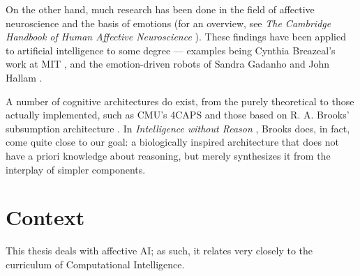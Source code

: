 \documentclass[bibliography=totoc ]{scrartcl}
\begin{document}
On the other hand, much research has been done in the field of affective neuroscience and the basis of emotions (for an overview, see {\em The Cambridge Handbook of Human Affective Neuroscience} \cite{cambridgeAff}). These findings have been applied to artificial intelligence to some degree --- examples being Cynthia Breazeal's work at MIT \cite{kismet, breazeal2003}, and the emotion-driven robots of Sandra Gadanho and John Hallam \cite{DBLP:journals/adb/GadanhoH01}.

A number of cognitive architectures do exist, from the purely theoretical \cite{emotionMachine} to those actually implemented, such as CMU's 4CAPS \cite{4caps} and those based on R. A. Brooks' subsumption architecture \cite{brooksSubsumption}. In {\em Intelligence without Reason} \cite{Brooks91intelligencewithout}, Brooks does, in fact, come quite close to our goal: a biologically inspired architecture that does not have a priori knowledge about reasoning, but merely synthesizes it from the interplay of simpler components.

\section{Context}

This thesis deals with affective AI; as such, it relates very closely to the curriculum of Computational Intelligence.

\pagebreak



\end{document}
